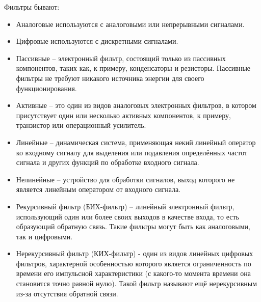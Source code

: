 \documentclass[a4paper,12pt]{article}
\begin{document}
Фильтры бывают:
\begin{itemize}
 \item Аналоговые используются с аналоговыми или непрерывными сигналами.
 \item Цифровые  используются с дискретными сигналами.
 \item Пассивные -- электронный фильтр, состоящий только из пассивных компонентов, таких как, к примеру, конденсаторы и резисторы. Пассивные фильтры не требуют никакого источника энергии для своего функционирования.
 \item Активные -- это один из видов аналоговых электронных фильтров, в котором присутствует один или несколько активных компонентов, к примеру, транзистор или операционный усилитель. 
 \item Линейные -- динамическая система, применяющая некий линейный оператор ко входному сигналу для выделения или подавления определённых частот сигнала и других функций по обработке входного сигнала.
 \item Нелинейные -- устройство для обработки сигналов, выход которого не является линейным оператором от входного сигнала.
 \item Рекурсивный фильтр (БИХ-фильтр) -- линейный электронный фильтр, использующий один или более своих выходов в качестве входа, то есть образующий обратную связь. Такие фильтры могут быть как аналоговыми, так и цифровыми.
 \item Нерекурсивный фильтр (КИХ-фильтр) -  один из видов линейных цифровых фильтров, характерной особенностью которого является ограниченность по времени его импульсной характеристики (с какого-то момента времени она становится точно равной нулю). Такой фильтр называют ещё нерекурсивным из-за отсутствия обратной связи.
\end{itemize}
\end{document}
